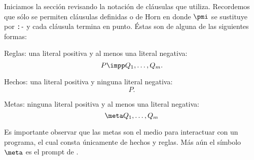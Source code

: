 \documentclass[11pt,letterpaper]{article}
\begin{document}
Iniciamos la secci\'on revisando la notaci\'on de cl\'ausulas que {\pl}
utiliza. Recordemos que s\'olo se permiten cl\'ausulas definidas o de Horn en 
donde $\pmi$ se sustituye por \verb!:-! y cada cl\'ausula termina en punto.
\'Estas son de alguna de las siguientes formas:
\bi
\item Reglas: una literal positiva y al menos una literal negativa:
  $$ P\impp Q_1,\ldots,Q_m. $$
\item Hechos: una literal positiva y ninguna literal negativa:
  $$ P.$$ 
\item Metas: ninguna literal positiva y al menos una literal negativa:
  $$\meta Q_1,\ldots,Q_m$$ 
\ei

Es importante observar que las metas son el medio para interactuar con
un programa, el cual consta \'unicamente de hechos y reglas. M\'as a\'un el
s\'imbolo $\meta$ es el prompt de {\pl}.

\end{document}

